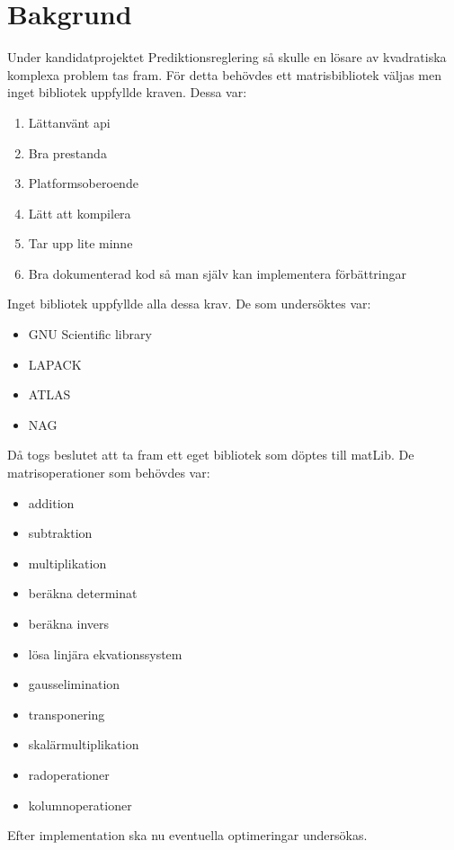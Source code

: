 \section{Bakgrund}
Under kandidatprojektet Prediktionsreglering så skulle en lösare av kvadratiska komplexa problem tas fram. För detta behövdes ett matrisbibliotek väljas men inget bibliotek uppfyllde kraven. Dessa var:
\begin{enumerate}

\item Lättanvänt api
\item Bra prestanda
\item Platformsoberoende
\item Lätt att kompilera
\item Tar upp lite minne
\item Bra dokumenterad kod så man själv kan implementera förbättringar

\end{enumerate} 

Inget bibliotek uppfyllde alla dessa krav. De som undersöktes var:
\begin{itemize}

\item GNU Scientific library
\item LAPACK
\item ATLAS
\item NAG

\end{itemize}
Då togs beslutet att ta fram ett eget bibliotek som döptes till matLib. De matrisoperationer som behövdes var:
\begin{itemize}

\item addition
\item subtraktion
\item multiplikation
\item beräkna determinat
\item beräkna invers
\item lösa linjära ekvationssystem
\item gausselimination
\item transponering
\item skalärmultiplikation
\item radoperationer
\item kolumnoperationer

\end{itemize}
Efter implementation ska nu eventuella optimeringar undersökas. 

